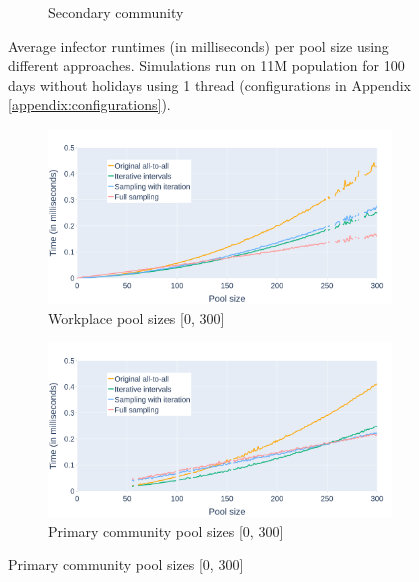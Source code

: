 \begin{figure}
\begin{subfigure}{.8\linewidth}
        \caption{Secondary community}
        \label{fig:times_avg_fs_pType_secondary_full}
    \end{subfigure}
    \caption{Average infector runtimes (in milliseconds) per pool size using different approaches. Simulations run on 11M population for 100 days without holidays using 1 thread (configurations in Appendix \ref{appendix:configurations}).}
    \label{fig:times_avg_fs_pType_full}
\end{figure}

\begin{figure}
    \centering
    \begin{subfigure}{.8\linewidth}
        \centering
        \includegraphics[width=\textwidth]{4 - Sampling/fig/full_sampling/times_avg_fs_pType_workplace.png}
        \caption{Workplace pool sizes [0, 300]}
        \label{fig:times_avg_fs_pType_workplace}
    \end{subfigure}
    \begin{subfigure}{.8\linewidth}
        \centering
        \includegraphics[width=\textwidth]{4 - Sampling/fig/full_sampling/times_avg_fs_pType_primary.png}
        \caption{Primary community pool sizes [0, 300]}
        \label{fig:times_avg_fs_pType_primary}
    \end{subfigure}

\end{figure}

